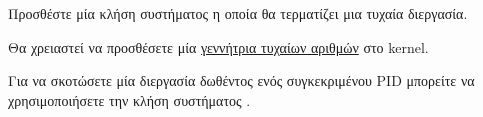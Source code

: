 \documentclass[18pt]{extarticle}
\begin{document}
\begin{question}
    Προσθέστε μία κλήση συστήματος η οποία θα τερματίζει μια τυχαία διεργασία.

    Θα χρειαστεί να προσθέσετε μία \href{https://wiki.osdev.org/Random_Number_Generator#Pseudorandom_number_generators}{γεννήτρια τυχαίων αριθμών} στο kernel.

    \begin{info}[Σημείωση:]
        Για να σκοτώσετε μία διεργασία δωθέντος ενός συγκεκριμένου PID
        μπορείτε να χρησιμοποιήσετε την κλήση συστήματος .
    \end{info}
\end{question}


\printbibliography
\end{document}
